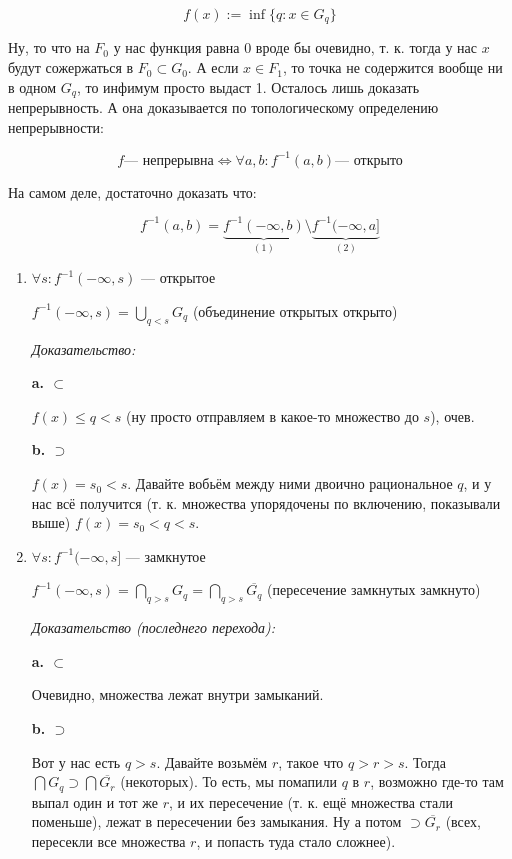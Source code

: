\documentclass{article}
\begin{document}
\[f(x) := \inf \{q: x \in G_q\}\]

Ну, то что на $F_0$ у нас функция равна 0 вроде бы очевидно, т. к. тогда у нас $x$ будут сожержаться в $F_0 \subset G_0$. А если $x \in F_1$, то точка не содержится вообще ни в одном $G_q$, то инфимум просто выдаст 1. Осталось лишь доказать непрерывность. А она доказывается по топологическому определению непрерывности:

\[f \text{--- непрерывна} \Leftrightarrow \forall a, b:  f^{-1}(a, b) \text{--- открыто}\]

На самом деле, достаточно доказать что: 

\[f^{-1}(a, b) = \underbrace{f^{-1}(-\infty, b)}_{(1)} \setminus \underbrace{f^{-1}(-\infty, a]}_{(2)}\]

\begin{enumerate}
    \item $\forall s: f^{-1}(-\infty, s)$ --- открытое
    
    $f^{-1}(-\infty, s) = \bigcup_{q < s} G_q$ (объединение открытых открыто)

    \textit{Доказательство:}
    
    \textbf{a. $\subset$}
    
    $f(x) \le q < s$ (ну просто отправляем в какое-то множество до $s$), очев.

    \textbf{b. $\supset$}

    $f(x) = s_0 < s$. Давайте вобьём между ними двоично рациональное $q$, и у нас всё получится (т. к. множества упорядочены по включению, показывали выше) $f(x) = s_0 < q < s$.

    \item $\forall s: f^{-1}(-\infty, s]$ --- замкнутое
    
    $f^{-1}(-\infty, s) = \bigcap_{q > s} G_q = \bigcap_{q > s} \overline{G_q}$ (пересечение замкнутых замкнуто)

    \textit{Доказательство (последнего перехода):}
    
    \textbf{a. $\subset$}
    
    Очевидно, множества лежат внутри замыканий.

    \textbf{b. $\supset$}

    Вот у нас есть $q > s$. Давайте возьмём $r$, такое что $q > r > s$. Тогда $\bigcap G_q \supset \bigcap \overline{G_r}$ (некоторых). То есть, мы помапили $q$ в $r$, возможно где-то там выпал один и тот же $r$, и их пересечение (т. к. ещё множества стали поменьше), лежат в пересечении без замыкания. Ну а потом $\supset \overline{G_r}$ (всех, пересекли все множества $r$, и попасть туда стало сложнее).
\end{enumerate}
\end{document}
